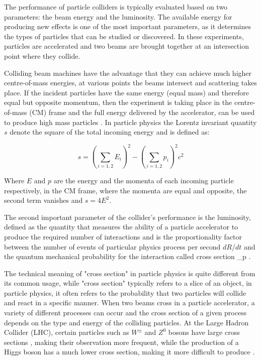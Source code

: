 The performance of particle colliders is typically evaluated based on two parameters: the beam energy and the luminosity. The available energy for producing new effects is one of the most important parameters, as it determines the types of particles that can be studied or discovered. In these experiments, particles are accelerated and two beams are brought together at an intersection point where they collide.

Colliding beam machines have the advantage that they can achieve much higher centre-of-mass energies, at various points the beams intersect and scattering takes place. If the incident particles have the same energy (equal mass) and therefore equal but opposite momentum, then the experiment is taking place in the centre-of-mass (CM) frame and the full energy delivered by the accelerator, can be used to produce high mass particles  \cite{undergraduate_accelerators_chapter}.
In particle physics the Lorentz invariant quantity $s$ denote the square of the total incoming energy and is defined as: 

\begin{equation}
s = \left ( \sum_{i = 1,2}^{}E_{i} \right )^{2}-\left ( \sum_{i = 1,2}^{}p_{i} \right )^{2}c^{2}
\end{equation}

Where $E$ and \textbf{$p$}  are the energy and the momenta of each incoming particle respectively, in the CM frame, where the momenta are equal and opposite, the second term vanishes and  $s = 4E^2$.

The second important parameter of the collider's performance is the luminosity, defined as the  quantity that measures the ability of a particle accelerator to produce the required number of interactions and is the proportionality factor  between the number of events of particular physics process per second $dR/dt$ and the quantum mechanical probability for the interaction called cross section \sigma_{p} \cite{ref_lib_vol3}.

The technical meaning of "cross section" in particle physics is quite different from its common usage, while "cross section" typically refers to a slice of an object, in particle physics, it often refers to the probability that two particles will collide and react in a specific manner. When two beams cross in a particle accelerator, a variety of different processes can occur and  the cross section of a given process depends on the type and energy of the colliding particles.
At the Large Hadron Collider (LHC), certain particles such as  $W^{\pm}$ and $Z^{0}$ bosons have large cross sections , making their observation more frequent, while the production of a Higgs boson has a much lower cross section, making it more difficult to produce \cite{thomson_2013}.\\

